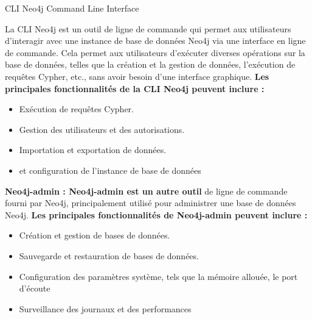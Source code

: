 \begin{frame}{	CLI Neo4j Command Line Interface}
  
    La CLI Neo4j est un outil de ligne de commande qui permet aux utilisateurs d'interagir avec une instance de base de données Neo4j via une interface en ligne de commande. Cela permet aux utilisateurs d'exécuter diverses opérations sur la base de données, telles que la création et la gestion de données, l'exécution de requêtes Cypher, etc., sans avoir besoin d'une interface graphique.
\textbf{Les principales fonctionnalités de la CLI Neo4j peuvent inclure :}
  \begin{itemize}
      \item Exécution de requêtes Cypher.
       \item Gestion des utilisateurs et des autorisations.
        \item Importation et exportation de données.
         \item et configuration de l'instance de base de données
  \end{itemize}

\textbf{	Neo4j-admin : Neo4j-admin est un autre outil} de ligne de commande fourni par Neo4j, principalement utilisé pour administrer une base de données Neo4j.
\textbf{Les principales fonctionnalités de Neo4j-admin peuvent inclure :}
\begin{itemize}
    \item Création et gestion de bases de données.
     \item Sauvegarde et restauration de bases de données.
      \item Configuration des paramètres système, tels que la mémoire allouée, le port d'écoute
       \item Surveillance des journaux et des performances
\end{itemize}

 
\end{frame}